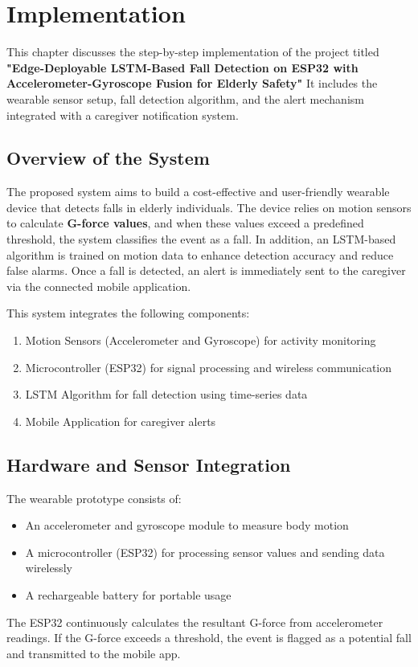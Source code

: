 \documentclass[a4paper, 12pt]{report}
\begin{document}
\chapter{Implementation}

This chapter discusses the step-by-step implementation of the project titled \textbf{"Edge-Deployable LSTM-Based Fall Detection on ESP32 with Accelerometer-Gyroscope Fusion for Elderly Safety"} It includes the wearable sensor setup, fall detection algorithm, and the alert mechanism integrated with a caregiver notification system.

\section{Overview of the System}
The proposed system aims to build a cost-effective and user-friendly wearable device that detects falls in elderly individuals. The device relies on motion sensors to calculate \textbf{G-force values}, and when these values exceed a predefined threshold, the system classifies the event as a fall. In addition, an LSTM-based algorithm is trained on motion data to enhance detection accuracy and reduce false alarms. Once a fall is detected, an alert is immediately sent to the caregiver via the connected mobile application.

This system integrates the following components:
\begin{enumerate}[itemsep=-4pt]
    \item Motion Sensors (Accelerometer and Gyroscope) for activity monitoring
    \item Microcontroller (ESP32) for signal processing and wireless communication
    \item LSTM Algorithm for fall detection using time-series data
    \item Mobile Application for caregiver alerts
\end{enumerate}

\section{Hardware and Sensor Integration}
The wearable prototype consists of:
\begin{itemize}[itemsep=-4pt]
    \item An accelerometer and gyroscope module to measure body motion
    \item A microcontroller (ESP32) for processing sensor values and sending data wirelessly
    \item A rechargeable battery for portable usage
\end{itemize}
The ESP32 continuously calculates the resultant G-force from accelerometer readings. If the G-force exceeds a threshold, the event is flagged as a potential fall and transmitted to the mobile app.
\end{document}
